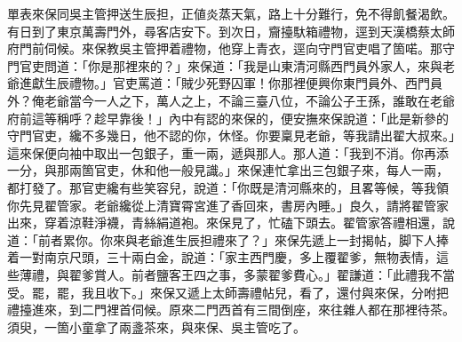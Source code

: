 單表來保同吳主管押送生辰担，正値炎蒸天氣，路上十分難行，免不得飢餐渴飲。有日到了東京萬壽門外，尋客店安下。到次日，齎擡馱箱禮物，逕到天漢橋蔡太師府門前伺候。來保教吳主管押着禮物，他穿上青衣，逕向守門官吏唱了箇喏。那守門官吏問道：「你是那裡來的？」來保道：「我是山東清河縣西門員外家人，{}來與老爺進獻生辰禮物。」官吏罵道：「賊少死野囚軍！你那裡便興你東門員外、西門員外？俺老爺當今一人之下，萬人之上，不論三臺八位，不論公子王孫，誰敢在老爺府前這等稱呼？{}趁早靠後！」內中有認的來保的，便安撫來保說道：「此是新參的守門官吏，纔不多幾日，他不認的你，休怪。你要稟見老爺，等我請出翟大叔來。」這來保便向袖中取出一包銀子，重一兩，遞與那人。那人道：「我到不消。你再添一分，與那兩箇官吏，休和他一般見識。」{}來保連忙拿出三包銀子來，每人一兩，都打發了。那官吏纔有些笑容兒，說道：「你既是清河縣來的，且畧等候，等我領你先見翟管家。老爺纔從上清寶霄宮進了香回來，書房內睡。」良久，請將翟管家出來，穿着涼鞋淨襪，青絲絹道袍。來保見了，忙磕下頭去。翟管家答禮相還，說道：「前者累你。你來與老爺進生辰担禮來了？」來保先遞上一封揭帖，脚下人捧着一對南京尺頭，三十兩白金，說道：「家主西門慶，多上覆翟爹，無物表情，這些薄禮，與翟爹賞人。前者鹽客王四之事，多蒙翟爹費心。」翟謙道：「此禮我不當受。罷，罷，我且收下。」來保又遞上太師壽禮帖兒，看了，還付與來保，分咐把禮擡進來，到二門裡首伺候。原來二門西首有三間倒座，來往雜人都在那裡待茶。須臾，一箇小童拿了兩盞茶來，與來保、吳主管吃了。

